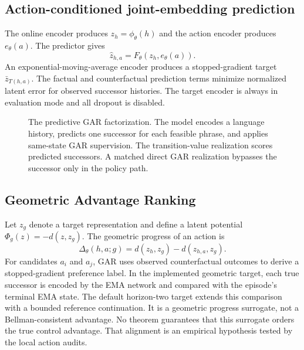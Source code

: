 \subsection{Action-conditioned joint-embedding prediction}

The online encoder produces $z_h=\phi_\theta(h)$ and the action encoder produces $e_\theta(a)$. The predictor gives
\begin{equation}
    \widehat z_{h,a}=F_\theta(z_h,e_\theta(a)).
\end{equation}
An exponential-moving-average encoder produces a stopped-gradient target $\bar z_{T(h,a)}$. The factual and counterfactual prediction terms minimize normalized latent error for observed successor histories. The target encoder is always in evaluation mode and all dropout is disabled.

\begin{figure}[t]
    \centering
    \resizebox{\linewidth}{!}{}
    \caption{The predictive GAR factorization. The model encodes a language history, predicts one successor for each feasible phrase, and applies same-state GAR supervision. The transition-value realization scores predicted successors. A matched direct GAR realization bypasses the successor only in the policy path.}
    \label{fig:method}
\end{figure}

\subsection{Geometric Advantage Ranking}

Let $z_g$ denote a target representation and define a latent potential $\Phi_g(z)=-d(z,z_g)$. The geometric progress of an action is
\begin{equation}
    \Delta_\theta(h,a;g)=d(z_h,z_g)-d(\widehat z_{h,a},z_g).
\end{equation}
For candidates $a_i$ and $a_j$, GAR uses observed counterfactual outcomes to derive a stopped-gradient preference label. In the implemented geometric target, each true successor is encoded by the EMA network and compared with the episode's terminal EMA state. The default horizon-two target extends this comparison with a bounded reference continuation. It is a geometric progress surrogate, not a Bellman-consistent advantage. No theorem guarantees that this surrogate orders the true control advantage. That alignment is an empirical hypothesis tested by the local action audits.

